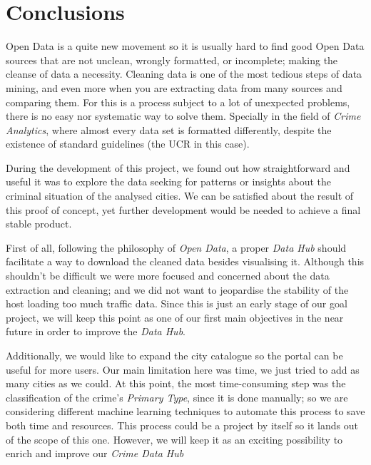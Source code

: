 \section{Conclusions}

Open Data is a quite new movement so it is usually hard to find good Open Data sources that are not unclean, wrongly formatted, or incomplete; making the cleanse of data a necessity. Cleaning data is one of the most tedious steps of data mining, and even more when you are extracting data from many sources and comparing them. For this is a process subject to a lot of unexpected problems, there is no easy nor systematic way to solve them. Specially in the field of \emph{Crime Analytics}, where almost every data set is formatted differently, despite the existence of standard guidelines (the UCR in this case).

During the development of this project, we found out how straightforward and useful it was to explore the data seeking for patterns or insights about the criminal situation of the analysed cities. We can be satisfied about the result of this proof of concept, yet further development would be needed to achieve a final stable product.

\bigskip
First of all, following the philosophy of \emph{Open Data}, a proper \emph{Data Hub} should facilitate a way to download the cleaned data besides visualising it. Although this shouldn't be difficult we were more focused and concerned about the data extraction and cleaning; and we did not want to jeopardise the stability of the host loading too much traffic data. Since this is just an early stage of our goal project, we will keep this point as one of our first main objectives in the near future in order to improve the \emph{Data Hub}.

Additionally, we would like to expand the city catalogue so the portal can be useful for more users. Our main limitation here was time, we just tried to add as many cities as we could. At this point, the most time-consuming step was the classification of the crime's \emph{Primary Type}, since it is done manually; so we are considering different machine learning techniques to automate this process to save both time and resources. This process could be a project by itself so it lands out of the scope of this one. However, we will keep it as an exciting possibility to enrich and improve our \emph{Crime Data Hub}

